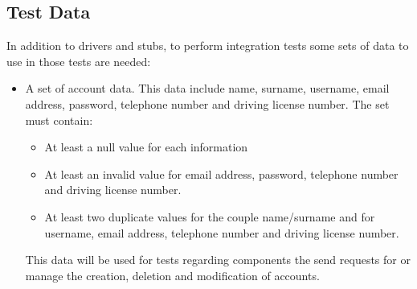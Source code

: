 \subsection{Test Data}
In addition to drivers and stubs, to perform integration tests some sets of data to use in those tests are needed:
\begin{itemize}

\item A set of account data. This data include name, surname, username, email address, password, telephone number and driving license number. The set must contain:
	\begin{itemize}[label={-}]
	\item At least a null value for each information
	\item At least an invalid value for email address, password, telephone number and driving license number.
	\item At least two duplicate values for the couple name/surname and for username, email address, telephone number and driving license number. 	
	\end{itemize}	 
This data will be used for tests regarding components the send requests for or manage the creation, deletion and modification of accounts.


\end{itemize}
